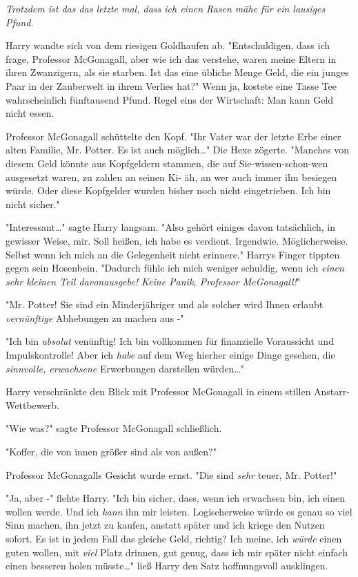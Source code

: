 {\emph{Trotzdem ist das das letzte mal, dass ich einen Rasen mähe für ein lausiges Pfund.}

Harry wandte sich von dem riesigen Goldhaufen ab. "Entschuldigen, dass ich frage, Professor McGonagall, aber wie ich das verstehe, waren meine Eltern in ihren Zwanzigern, als sie starben. Ist das eine übliche Menge Geld, die ein junges Paar in der Zauberwelt in ihrem Verlies hat?" Wenn ja, kostete eine Tasse Tee wahrscheinlich fünftausend Pfund. Regel eins der Wirtschaft: Man kann Geld nicht essen.

Professor McGonagall schüttelte den Kopf. "Ihr Vater war der letzte Erbe einer alten Familie, Mr. Potter. Es ist auch möglich…" Die Hexe zögerte. "Manches von diesem Geld könnte aus Kopfgeldern stammen, die auf Sie-wissen-schon-wen ausgesetzt waren, zu zahlen an seinen Ki- äh, an wer auch immer ihn besiegen würde. Oder diese Kopfgelder wurden bisher noch nicht eingetrieben. Ich bin nicht sicher."

"Interessant…" sagte Harry langsam. "Also gehört einiges davon tatsächlich, in gewisser Weise, mir. Soll heißen, ich habe es verdient. Irgendwie. Möglicherweise. Selbst wenn ich mich an die Gelegenheit nicht erinnere." Harrys Finger tippten gegen sein Hosenbein. "Dadurch fühle ich mich weniger schuldig, wenn ich \emph{einen sehr kleinen Teil davonausgebe! Keine Panik, Professor McGonagall!}"

"Mr. Potter! Sie sind ein Minderjähriger und als solcher wird Ihnen erlaubt \emph{vernünftige} Abhebungen zu machen aus -"

"Ich bin \emph{absolut} venünftig! Ich bin vollkommen für finanzielle Voraussicht und Impulskontrolle! Aber ich \emph{habe} auf dem Weg hierher einige Dinge gesehen, die \emph{sinnvolle, erwachsene} Erwerbungen darstellen würden…"

Harry verschränkte den Blick mit Professor McGonagall in einem stillen Anstarr-Wettbewerb.

"Wie was?" sagte Professor McGonagall schließlich.

"Koffer, die von innen größer sind als von außen?"

Professor McGonagalls Gesicht wurde ernst. "Die sind \emph{sehr} teuer, Mr. Potter!"

"Ja, aber -" flehte Harry. "Ich bin sicher, dass, wenn ich erwachsen bin, ich einen wollen werde. Und ich \emph{kann} ihn mir leisten. Logischerweise würde es genau so viel Sinn machen, ihn jetzt zu kaufen, anstatt später und ich kriege den Nutzen sofort. Es ist in jedem Fall das gleiche Geld, richtig? Ich meine, ich \emph{würde} einen guten wollen, mit \emph{viel} Platz drinnen, gut genug, dass ich mir später nicht einfach einen besseren holen müsste…" ließ Harry den Satz hoffnungsvoll ausklingen.

}
